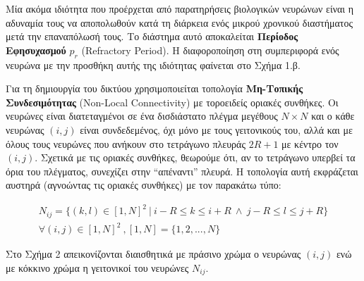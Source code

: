 \documentclass[12pt,a4paper]{article}
\begin{document}
Μία ακόμα ιδιότητα που προέρχεται από παρατηρήσεις βιολογικών νευρώνων είναι η αδυναμία τους να αποπολωθούν κατά τη διάρκεια ενός μικρού χρονικού διαστήματος μετά την επαναπόλωσή τους. Το διάστημα αυτό αποκαλείται \textbf{Περίοδος Εφησυχασμού} $p_r$ (Refractory Period). Η διαφοροποίηση στη συμπεριφορά ενός νευρώνα με την προσθήκη αυτής της ιδιότητας φαίνεται στο Σχήμα 1.β.

Για τη δημιουργία του δικτύου χρησιμοποιείται τοπολογία \textbf{Μη-Τοπικής Συνδεσιμότητας }(Non-Local Connectivity) με τοροειδείς οριακές συνθήκες. Οι νευρώνες είναι διατεταγμένοι σε ένα δισδιάστατο πλέγμα μεγέθους $N \times N$ και ο κάθε νευρώνας $(i,j)$ είναι συνδεδεμένος, όχι μόνο με τους γειτονικούς του, αλλά και με όλους τους νευρώνες που ανήκουν στο τετράγωνο πλευράς $2R+1$ με κέντρο τον $(i,j)$. Σχετικά με τις οριακές συνθήκες, θεωρούμε ότι, αν το τετράγωνο υπερβεί τα όρια του πλέγματος, συνεχίζει στην ``απέναντι'' πλευρά. Η τοπολογία αυτή εκφράζεται αυστηρά (αγνοώντας τις οριακές συνθήκες) με τον παρακάτω τύπο:

\begin{equation}
\begin{split}
N_{ij} = \{(k,l) \in {[1,N]}^{2} \ | \ i-R \leq k \leq i+R 
\ \wedge \ j-R \leq l \leq j+R \} \\
\forall (i,j) \in {[1,N]}^{2} \ ,[1,N] = \{1,2,...,N\}
\end{split}
\end{equation}

Στο Σχήμα 2 απεικονίζονται διαισθητικά με πράσινο χρώμα ο νευρώνας $(i,j)$ ενώ με κόκκινο χρώμα η γειτονικοί του νευρώνες $N_{ij}$.
 
\end{document}
